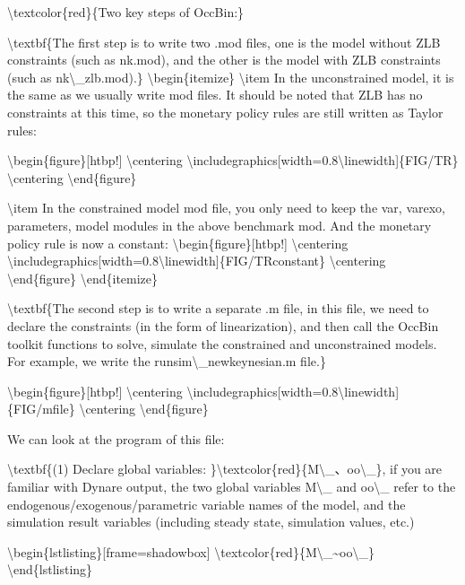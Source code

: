 \documentclass[10pt,math=newtx,citestyle=gb7714-2015,bibstyle=gb7714-2015]{elegantbook}
\begin{document}
	\textbackslash{}textcolor\{red\}\{Two key steps of OccBin:\}
	
	\textbackslash{}textbf\{The first step is to write two .mod files, one is the model without ZLB constraints (such as nk.mod), and the other is the model with ZLB constraints (such as nk\textbackslash{}\_zlb.mod).\}
	\textbackslash{}begin\{itemize\}
	\textbackslash{}item In the unconstrained model, it is the same as we usually write mod files. It should be noted that ZLB has no constraints at this time, so the monetary policy rules are still written as Taylor rules:
	
	\textbackslash{}begin\{figure\}[htbp!]
	\textbackslash{}centering
	\textbackslash{}includegraphics[width=0.8\textbackslash{}linewidth]\{FIG/TR\}
	\textbackslash{}centering
	\textbackslash{}end\{figure\}
	
	\textbackslash{}item In the constrained model mod file, you only need to keep the var, varexo, parameters, model modules in the above benchmark mod. And the monetary policy rule is now a constant:
	\textbackslash{}begin\{figure\}[htbp!]
	\textbackslash{}centering
	\textbackslash{}includegraphics[width=0.8\textbackslash{}linewidth]\{FIG/TRconstant\}
	\textbackslash{}centering
	\textbackslash{}end\{figure\}
	\textbackslash{}end\{itemize\}
	
	\textbackslash{}textbf\{The second step is to write a separate .m file, in this file, we need to declare the constraints (in the form of linearization), and then call the OccBin toolkit functions to solve, simulate the constrained and unconstrained models. For example, we write the runsim\textbackslash{}\_newkeynesian.m file.\}
	
	\textbackslash{}begin\{figure\}[htbp!]
	\textbackslash{}centering
	\textbackslash{}includegraphics[width=0.8\textbackslash{}linewidth]\{FIG/mfile\}
	\textbackslash{}centering
	\textbackslash{}end\{figure\}
	
	We can look at the program of this file:
	
	\textbackslash{}textbf\{(1) Declare global variables: \}\textbackslash{}textcolor\{red\}\{M\textbackslash{}\_、oo\textbackslash{}\_\}, if you are familiar with Dynare output, the two global variables M\textbackslash{}\_ and oo\textbackslash{}\_ refer to the endogenous/exogenous/parametric variable names of the model, and the simulation result variables (including steady state, simulation values, etc.)
	
	\textbackslash{}begin\{lstlisting\}[frame=shadowbox]
	\textbackslash{}textcolor\{red\}\{M\textbackslash{}\_\~{}oo\textbackslash{}\_\}
	\textbackslash{}end\{lstlisting\}
	
\end{document}
